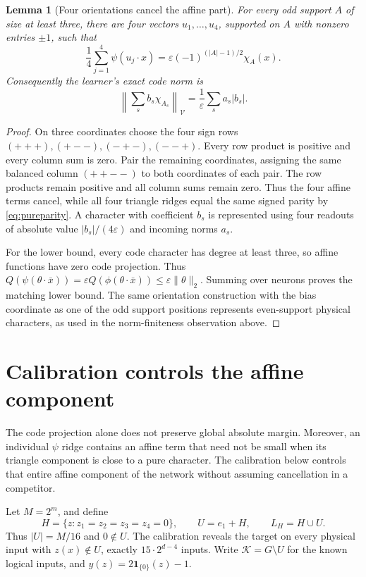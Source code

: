 \documentclass[11pt]{article}
\newtheorem{lemma}[theorem]{Lemma}
\newcommand{\one}{\mathbf 1}
\newcommand{\cV}{\mathcal V}
\newcommand{\eps}{\varepsilon}
\begin{document}
\begin{lemma}[Four orientations cancel the affine part]\label{lem:orientations}
For every odd support $A$ of size at least three, there are four
vectors $u_1,\ldots,u_4$, supported on $A$ with nonzero entries
$\pm1$, such that
\[
 \frac14\sum_{j=1}^4\psi(u_j\cdot x)
       =\eps(-1)^{(|A|-1)/2}\chi_A(x).
\]
Consequently the learner's exact code norm is
\begin{equation}\label{eq:monotonenorm}
 \left\|\sum_s b_s\chi_{A_s}\right\|_{\cV}
       =\frac1\eps\sum_s a_s|b_s|.
\end{equation}
\end{lemma}
\begin{proof}
On three coordinates choose the four sign rows
$(+++),(+--),(-+-),(--+)$. Every row product is positive and every
column sum is zero. Pair the remaining coordinates, assigning the
same balanced column $(++--)$ to both coordinates of each pair.
The row products remain positive and all column sums remain zero.
Thus the four affine terms cancel, while all four triangle ridges
equal the same signed parity by \eqref{eq:pureparity}. A character
with coefficient $b_s$ is represented using four readouts of absolute
value $|b_s|/(4\eps)$ and incoming norms $a_s$.

For the lower bound, every code character has degree at least three,
so affine functions have zero code projection. Thus
$Q(\psi(\theta\cdot\bar x))=\eps Q(\phi(\theta\cdot\bar x))
\le\eps\|\theta\|_2$. Summing over neurons proves the matching lower
bound. The same orientation construction with the bias coordinate as
one of the odd support positions represents even-support physical
characters, as used in the norm-finiteness observation above.
\end{proof}

\section{Calibration controls the affine component}

The code projection alone does not preserve global absolute margin.
Moreover, an individual $\psi$ ridge contains an affine term that need
not be small when its triangle component is close to a pure character.
The calibration below controls that entire affine component of the
network without assuming cancellation in a competitor.

Let $M=2^m$, and define
\begin{equation}\label{eq:freecoset}
 H=\{z:z_1=z_2=z_3=z_4=0\},\qquad
 U=e_1+H,\qquad L_H=H\cup U.
\end{equation}
Thus $|U|=M/16$ and $0\notin U$. The calibration reveals the target
on every physical input with $z(x)\notin U$, exactly
$15\cdot2^{d-4}$ inputs. Write $\mathcal K=G\setminus U$ for the known logical
inputs, and $y(z)=2\one_{\{0\}}(z)-1$.
\end{document}

